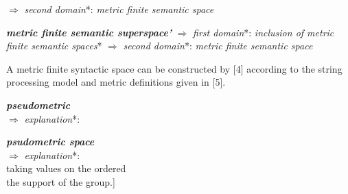 \documentclass{article}
\begin{document}
\begin{multicols}{2}



$\Rightarrow$ \hspace{0.5cm}  \textit{second domain}*: \newline
\hspace*{2.8em} \textit{metric finite semantic space}

\textbf{\textit{metric finite semantic superspace'}} \newline
$\Rightarrow$ \hspace{0.5cm} \textit{ first domain}*: \newline
\hspace*{2.8em} \textit{inclusion of metric finite 
semantic spaces}* \newline
$\Rightarrow$ \hspace{0.5cm}  \textit{second domain}*:
 \newline
\hspace*{2.8em} \textit{metric finite semantic space}


\hspace{0.27cm} A metric finite syntactic space can be constructed by
[4] according to the string processing model and metric
definitions given in [5].




\begin{tabbing}
 \textbf{\textit{pseudometric}} \\ $\Rightarrow$ \hspace{0.5cm} \= \textit{explanation}*: \\ 
\end{tabbing}



\begin{tabbing}
\textbf{\textit{psudometric space}} \\ $\Rightarrow$ \hspace{0.5cm} \= \textit{explanation}*: \\ \>[A pseudometric space is a set with a function \\ \> of two arguments defined on it, which is a \\ \> pseudometric [16] taking values on the ordered \\ \> the support of the group.]
\end{tabbing}




\end{multicols}
\end{document}
